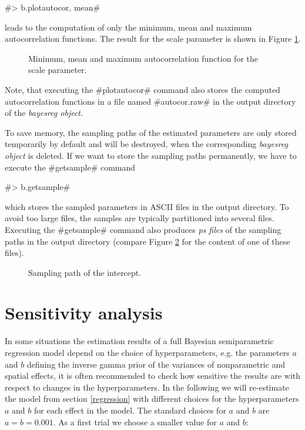 \documentclass{article}
\begin{document}
#> b.plotautocor, mean#

leads to the computation of only the minimum, mean and maximum
autocorrelation functions. The result for the scale parameter is
shown in Figure \ref{autocor2}.

\begin{figure}[ht]
\begin{center}
{\it\caption{Minimum, mean and maximum autocorrelation function
for the scale parameter.\label{autocor2}}}
\end{center}
\end{figure}

Note, that executing the #plotautocor# command also stores the
computed autocorrelation functions in a file named #autocor.raw#
in the output directory of the {\it bayesreg object}.

To save memory, the sampling paths of the estimated parameters are
only stored temporarily by default and will be destroyed, when the
corresponding {\em bayesreg object} is deleted. If we want to
store the sampling paths permanently, we have to execute the
#getsample# command

#> b.getsample#

which stores the sampled parameters in ASCII files in the output
directory. To avoid too large files, the samples are typically
partitioned into several files. Executing the #getsample# command
also produces {\em ps files} of the sampling paths in the output
directory (compare Figure \ref{sample1} for the content of one of
these files).

\begin{figure}[ht]
\begin{center}
{\it\caption{Sampling path of the intercept.\label{sample1}}}
\end{center}
\end{figure}

\section{Sensitivity analysis}\label{sensitivity}

In some situations the estimation results of a full Bayesian
semiparametric regression model depend on the choice of
hyperparameters, e.g. the parameters $a$ and $b$ defining the
inverse gamma prior of the variances of nonparametric and spatial
effects, it is often recommended to check how sensitive the
results are with respect to changes in the hyperparameters. In the
following we will re-estimate the model from section
\ref{regression} with different choices for the hyperparameters
$a$ and $b$ for each effect in the model. The standard choices for
$a$ and $b$ are $a=b=0.001$. As a first trial we choose a smaller
value for $a$ and $b$:
\end{document}
